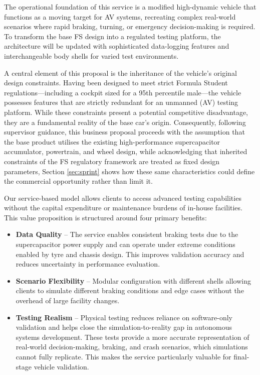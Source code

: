 \documentclass[11pt, a4paper]{report}
\numberwithin{equation}{section}
\begin{document}
\begin{refsection}
The operational foundation of this service is a modified high-dynamic vehicle that functions as a moving target for AV systems, recreating complex real-world scenarios where rapid braking, turning, or emergency decision-making is required. To transform the base FS design into a regulated testing platform, the architecture will be updated with sophisticated data-logging features and interchangeable body shells for varied test environments.

A central element of this proposal is the inheritance of the vehicle's original design constraints. Having been designed to meet strict Formula Student regulations—including a cockpit sized for a 95th percentile male—the vehicle possesses features that are strictly redundant for an unmanned (AV) testing platform. While these constraints present a potential competitive disadvantage, they are a fundamental reality of the base car’s origin. Consequently, following supervisor guidance, this business proposal proceeds with the assumption that the base product utilises the existing high-performance supercapacitor accumulator, powertrain, and wheel design, while acknowledging that inherited constraints of the FS regulatory framework are treated as fixed design parameters, Section \ref{sec:sprint} shows how these same characteristics could define the commercial opportunity rather than limit it.

Our service-based model allows clients to access advanced testing capabilities without the capital expenditure or maintenance burdens of in-house facilities. This value proposition is structured around four primary benefits:

\begin{itemize}
\item \textbf{Data Quality} -- The service enables consistent braking tests due to the supercapacitor power supply and can operate under extreme conditions enabled by tyre and chassis design. This improves validation accuracy and reduces uncertainty in performance evaluation.

\item \textbf{Scenario Flexibility} -- Modular configuration with different shells allowing clients to simulate different braking conditions and edge cases without the overhead of large facility changes.

\item \textbf{Testing Realism} -- Physical testing reduces reliance on software-only validation and helps close the simulation-to-reality gap in autonomous systems development. These tests provide a more accurate representation of real-world decision-making, braking, and crash scenarios, which simulations cannot fully replicate. This makes the service particularly valuable for final-stage vehicle validation.


\end{itemize}
\end{refsection}
\end{document}
